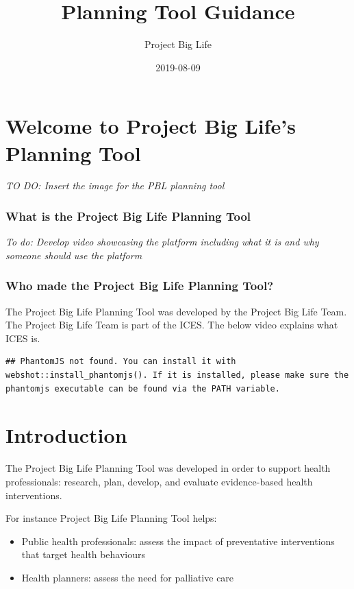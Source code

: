 \documentclass[]{book}
\title{Planning Tool Guidance}
\author{Project Big Life}
\date{2019-08-09}
\providecommand{\tightlist}{%
  \setlength{\itemsep}{0pt}\setlength{\parskip}{0pt}}
\begin{document}
\maketitle

{
\setcounter{tocdepth}{1}
\tableofcontents
}
\chapter{Welcome to Project Big Life's Planning
Tool}\label{welcome-to-project-big-lifes-planning-tool}

\emph{TO DO: Insert the image for the PBL planning tool}

\subsection{What is the Project Big Life Planning
Tool}\label{what-is-the-project-big-life-planning-tool}

\emph{To do: Develop video showcasing the platform including what it is
and why someone should use the platform}

\subsection{Who made the Project Big Life Planning
Tool?}\label{who-made-the-project-big-life-planning-tool}

The Project Big Life Planning Tool was developed by the Project Big Life
Team. The Project Big Life Team is part of the ICES. The below video
explains what ICES is.

\begin{verbatim}
## PhantomJS not found. You can install it with webshot::install_phantomjs(). If it is installed, please make sure the phantomjs executable can be found via the PATH variable.
\end{verbatim}

\chapter{Introduction}\label{introduction}

The Project Big Life Planning Tool was developed in order to support
health professionals: research, plan, develop, and evaluate
evidence-based health interventions.

For instance Project Big Life Planning Tool helps:

\begin{itemize}
\tightlist
\item
  Public health professionals: assess the impact of preventative
  interventions that target health behaviours
\item
  Health planners: assess the need for palliative care
\end{itemize}
\end{document}

